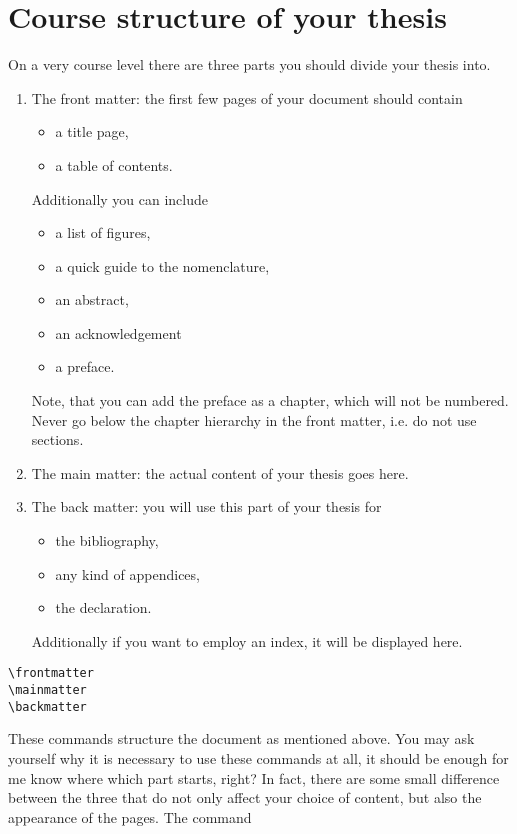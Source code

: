 \section{Course structure of your thesis}\label{sec:struc}
On a very course level there are three parts you should divide your thesis into. 
\begin{enumerate}
\item The front matter: the first few pages of your document should contain 
\begin{itemize}
\item a title page,
\item a table of contents. 
\end{itemize}
Additionally you can include
\begin{itemize}
\item a list of figures, 
\item a quick guide to the nomenclature, 
\item an abstract, 
\item an acknowledgement
\item a preface.
\end{itemize}
Note, that you can add the preface as a chapter, which will not be numbered. 
Never go below the chapter hierarchy in the front matter, i.e. do not use sections.
\item The main matter: the actual content of your thesis goes here.
\item The back matter: you will use this part of your thesis for 
\begin{itemize}
\item the bibliography,
\item any kind of appendices,
\item the declaration.
\end{itemize}
Additionally if you want to employ an index, it will be displayed here.
\end{enumerate}
\begin{emphBox}
\lstinline|\frontmatter|\\
\lstinline|\mainmatter|\\
\lstinline|\backmatter|
\end{emphBox}
These commands structure the document as mentioned above. You may ask yourself why it is 
necessary to use these commands at all, it should be enough for me know where which part 
starts, right? In fact, there are some small difference between the three that do not 
only affect your choice of content, but also the appearance of the pages. The command 
